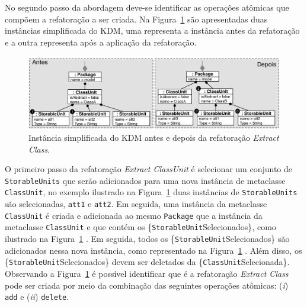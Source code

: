 No segundo passo da abordagem deve-se identificar as operações atômicas que compõem a refatoração a ser criada. Na Figura~\ref{fig:antes_e_depois_extract_ClassUnit} são apresentadas duas instâncias simplificada do KDM, uma representa a instância antes da refatoração e a outra representa após a aplicação da refatoração. 

\begin{figure}[h]
	\centering
	\caption{Instância simplificada do KDM antes e depois da refatoração \textit{Extract Class}.}
	\label{fig:antes_e_depois_extract_ClassUnit}
	\includegraphics[scale=0.6]{images/extractClassUnitAntesEDepois2}
	\fautor
\end{figure}

O primeiro passo da refatoração \textit{Extract ClassUnit} é selecionar um conjunto de \texttt{StorableUnits} que serão adicionados para uma nova instância de metaclasse \texttt{ClassUnit}, no exemplo ilustrado na Figura~\ref{fig:antes_e_depois_extract_ClassUnit}  duas instâncias de \texttt{StorableUnits} são selecionadas, \texttt{att1} e \texttt{att2}. Em seguida, uma instância da metaclasse \texttt{ClassUnit} é criada e adicionada ao mesmo \texttt{Package} que a instância da metaclasse \texttt{ClassUnit} e que contém os \{\texttt{StorableUnit}Selecionados\}, como ilustrado na Figura~\ref{fig:antes_e_depois_extract_ClassUnit} . Em seguida, todos os \{\texttt{StorableUnit}Selecionados\} são adicionados nessa nova instância, como representado na Figura~\ref{fig:antes_e_depois_extract_ClassUnit} . Além disso, os \{\texttt{StorableUnit}Selecionados\} devem ser deletados da \{\texttt{ClassUnit}Selecionada\}. Observando a Figura~\ref{fig:antes_e_depois_extract_ClassUnit} é possível identificar que é a refatoração \textit{Extract Class} pode ser criada por meio da combinação das seguintes operações atômicas: (\textit{i}) \texttt{add} e (\textit{ii}) \texttt{delete}. 


